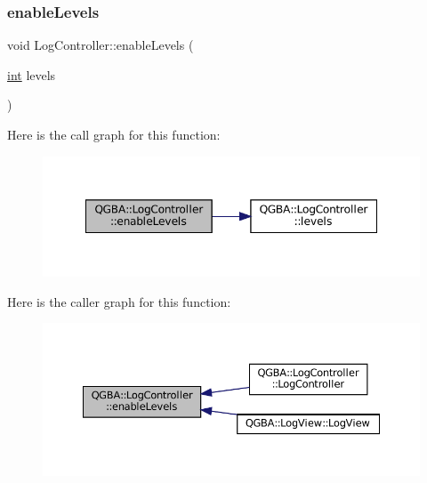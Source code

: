 \subsubsection{\texorpdfstring{enable\+Levels}{enableLevels}}
{\footnotesize\ttfamily void Log\+Controller\+::enable\+Levels (\begin{DoxyParamCaption}\item[{\mbox{\hyperlink{ioapi_8h_a787fa3cf048117ba7123753c1e74fcd6}{int}}}]{levels }\end{DoxyParamCaption})\hspace{0.3cm}{\ttfamily [slot]}}

Here is the call graph for this function\+:
\nopagebreak
\begin{figure}[H]
\begin{center}
\leavevmode
\includegraphics[width=348pt]{class_q_g_b_a_1_1_log_controller_ade271ceb4e1069fb77daaaffe5463300_cgraph}
\end{center}
\end{figure}
Here is the caller graph for this function\+:
\nopagebreak
\begin{figure}[H]
\begin{center}
\leavevmode
\includegraphics[width=350pt]{class_q_g_b_a_1_1_log_controller_ade271ceb4e1069fb77daaaffe5463300_icgraph}
\end{center}
\end{figure}
\mbox{\label{class_q_g_b_a_1_1_log_controller_a97283de881a6de4b0cfbdb398e5b8e10}} 
